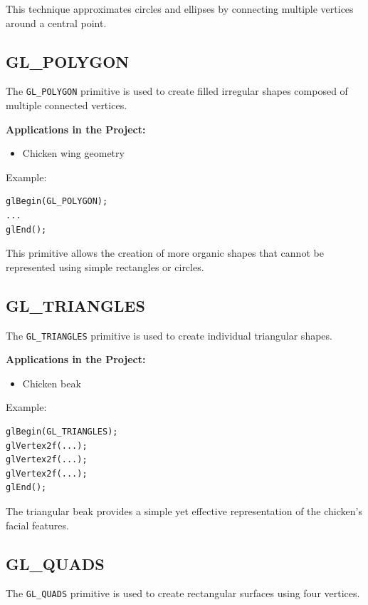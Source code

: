 \documentclass[12pt,a4paper]{report}
\begin{document}
This technique approximates circles and ellipses by connecting multiple vertices around a central point.

\subsection*{GL\_POLYGON}

The \texttt{GL\_POLYGON} primitive is used to create filled irregular shapes composed of multiple connected vertices.

\textbf{Applications in the Project:}

\begin{itemize}
\item Chicken wing geometry
\end{itemize}

Example:

\begin{verbatim}
glBegin(GL_POLYGON);
...
glEnd();
\end{verbatim}

This primitive allows the creation of more organic shapes that cannot be represented using simple rectangles or circles.

\subsection*{GL\_TRIANGLES}

The \texttt{GL\_TRIANGLES} primitive is used to create individual triangular shapes.

\textbf{Applications in the Project:}

\begin{itemize}
\item Chicken beak
\end{itemize}

Example:

\begin{verbatim}
glBegin(GL_TRIANGLES);
glVertex2f(...);
glVertex2f(...);
glVertex2f(...);
glEnd();
\end{verbatim}

The triangular beak provides a simple yet effective representation of the chicken's facial features.

\subsection*{GL\_QUADS}

The \texttt{GL\_QUADS} primitive is used to create rectangular surfaces using four vertices.
\end{document}
